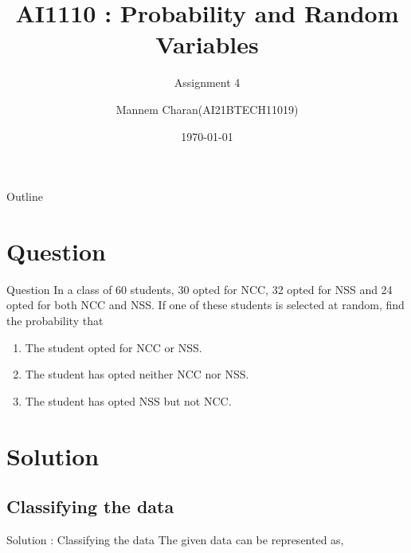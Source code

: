 \documentclass{beamer}
\title{AI1110 : Probability and Random Variables}
\subtitle{Assignment 4}
\author{Mannem Charan(AI21BTECH11019)}
\date{\today}
\begin{document}
\begin{frame}
    \titlepage 
\end{frame}


\begin{frame}{Outline}
    \tableofcontents
\end{frame}


\section{Question}
\begin{frame}{Question}
 In a class of 60 students, 30 opted for NCC, 32 opted for NSS and 24 opted for both NCC and NSS. If one of these students is selected at random, find the probability that
\begin{enumerate}[label = (\alph{enumi})]
    \item The student opted for NCC or NSS.
    \item The student has opted neither NCC nor NSS.
    \item The student has opted NSS but not NCC.
\end{enumerate}
\end{frame}


\section{Solution}
\subsection{Classifying the data}
\begin{frame}{Solution : Classifying the data}
     The given data can be represented as,
       \begin{table}[ht!]
        
        \caption{}
        \label{table:table 1}
       \end{table}
\end{frame}
\end{document}
